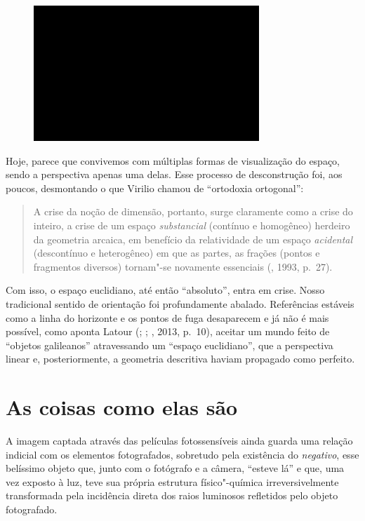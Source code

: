 \begin{figure}[!ht]
\centering
 \includegraphics[width=85mm]{./imgs/im1.jpg}
\caption{\tiny{}} 
\end{figure}

Hoje, parece que convivemos com múltiplas formas de visualização do
espaço, sendo a perspectiva apenas uma delas. Esse processo de
desconstrução foi, aos poucos, desmontando o que Virilio chamou de
``ortodoxia ortogonal'':

\begin{quote}
A crise da noção de dimensão, portanto, surge claramente como a crise do
inteiro, a crise de um espaço \emph{substancial} (contínuo e homogêneo)
herdeiro da geometria arcaica, em benefício da relatividade de um espaço
\emph{acidental} (descontínuo e heterogêneo) em que as partes, as
frações (pontos e fragmentos diversos) tornam"-se novamente essenciais
(, 1993, p.~27).
\end{quote}

Com isso, o espaço euclidiano, até então ``absoluto'', entra em crise.
Nosso tradicional sentido de orientação foi profundamente abalado.
Referências estáveis como a linha do horizonte e os pontos de fuga
desaparecem e já não é mais possível, como aponta Latour (;
; , 2013, p.~10), aceitar um mundo feito de
``objetos galileanos'' atravessando um ``espaço euclidiano'', que a
perspectiva linear e, posteriormente, a geometria descritiva haviam
propagado como perfeito.

\chapter{As coisas como elas são}

A imagem captada através das películas fotossensíveis ainda guarda uma
relação indicial com os elementos fotografados, sobretudo pela
existência do \emph{negativo}, esse belíssimo objeto que, junto com o
fotógrafo e a câmera, ``esteve lá'' e que, uma vez exposto à luz, teve
sua própria estrutura físico"-química irreversivelmente transformada pela
incidência direta dos raios luminosos refletidos pelo objeto
fotografado.

